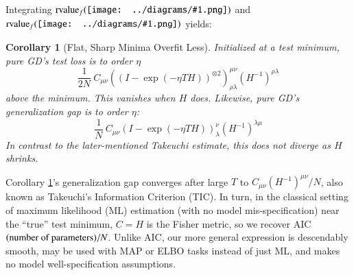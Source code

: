 \documentclass{article}
\theoremstyle{plain}
\newtheorem{cor}{Corollary}
\theoremstyle{definition}
\newcommand{\rvalue}{\text{\textnormal{rvalue}}}
\newcommand{\wrap}[1]{\left(#1\right)}
\newcommand{\sdia}[1]{\begin{gathered}\texttt{[image: ../diagrams/\#1.png]}\end{gathered}}
\begin{document}
        Integrating $\rvalue_f(\sdia{(01-2)(02-12)})$ and
        $\rvalue_f(\sdia{(01)(01)})$ yields:
        \begin{cor}[Flat, Sharp Minima Overfit Less]\label{cor:overfit}
            Initialized at a test minimum, pure GD's test loss is to
            order $\eta$
            $$
                \frac{1}{2N} ~
                    C_{\mu\nu}
                    \wrap{(I - \exp(-\eta T H))^{\otimes 2}}^{\mu\nu}_{\rho\lambda}
                    \wrap{H^{-1}}^{\rho\lambda}
            $$
            above the minimum.  This vanishes when $H$ does. 
            Likewise, pure GD's generalization gap is to order $\eta$:  
            $$
                \frac{1}{N} ~
                    C_{\mu\nu}
                    \wrap{I - \exp(-\eta T H)}^{\nu}_{\lambda}
                    \wrap{H^{-1}}^{\lambda\mu}
            $$
            In contrast to the later-mentioned Takeuchi estimate, this does not
            diverge as $H$ shrinks.
        \end{cor}
        Corollary \ref{cor:overfit}'s generalization gap converges after
        large $T$ to $C_{\mu\nu}(H^{-1})^{\mu\nu}/N$, also known as Takeuchi's
        Information Criterion (TIC).  In turn, in the classical setting of
        maximum likelihood (ML) estimation (with no model mis-specification)
        near the ``true'' test minimum, $C=H$ is the Fisher metric, so we
        recover AIC $(\textnormal{number of
        parameters})/N$.  Unlike AIC, our more general expression is
        descendably smooth, may be used with MAP or ELBO tasks instead of just
        ML, and makes no model well-specification assumptions.
\end{document}
